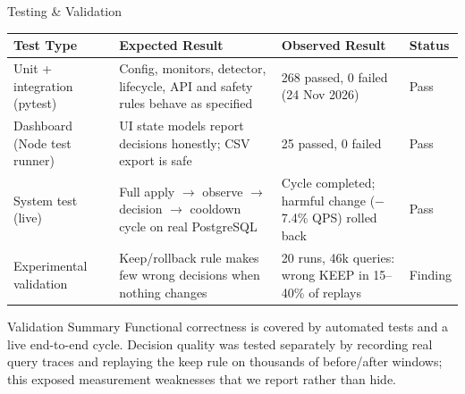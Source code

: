 \documentclass[aspectratio=169,11pt]{beamer}
\begin{document}
\begin{frame}{Testing \& Validation}

\scriptsize

\begin{center}

\renewcommand{\arraystretch}{1.3}

\begin{tabularx}{.96\textwidth}
{@{}p{2.3cm}X X p{1.2cm}@{}}

\toprule
Test Type &
Expected Result &
Observed Result &
Status\\
\midrule

Unit + integration (pytest) &
Config, monitors, detector, lifecycle, API and safety rules behave as specified &
268 passed, 0 failed (24 Nov 2026) &
Pass\\

Dashboard (Node test runner) &
UI state models report decisions honestly; CSV export is safe &
25 passed, 0 failed &
Pass\\

System test (live) &
Full apply $\rightarrow$ observe $\rightarrow$ decision $\rightarrow$ cooldown cycle on real PostgreSQL &
Cycle completed; harmful change ($-$7.4\% QPS) rolled back &
Pass\\

Experimental validation &
Keep/rollback rule makes few wrong decisions when nothing changes &
20 runs, 46k queries: wrong KEEP in 15--40\% of replays &
Finding\\

\bottomrule

\end{tabularx}

\end{center}

\vspace{2mm}

\begin{block}{Validation Summary}
\small
Functional correctness is covered by automated tests and a live end-to-end cycle.
Decision quality was tested separately by recording real query traces and replaying
the keep rule on thousands of before/after windows; this exposed measurement
weaknesses that we report rather than hide.
\end{block}

\end{frame}
\end{document}
